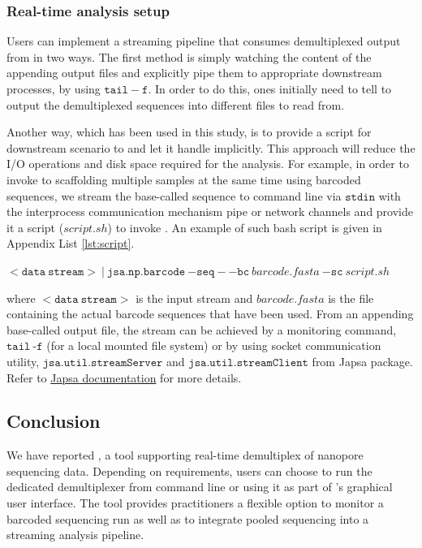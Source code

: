 \subsubsection{Real-time analysis setup}
Users can implement a streaming pipeline that consumes demultiplexed output from \npbarcode{} in two ways. 
The first method is simply watching the content of the appending output files and explicitly pipe them to appropriate downstream processes, \EG{} by using $\mathtt{tail -f}$.
In order to do this, ones initially need to tell \npbarcode{} to output the demultiplexed sequences into different files to read from.

Another way, which has been used in this study, is to provide a script for downstream scenario to \npbarcode{} and let it handle implicitly. This approach will reduce the I/O operations and disk space required for the analysis. For example, in order to invoke \npscarf{} to scaffolding multiple samples at the same time using barcoded sequences, we stream the base-called sequence to \npbarcode{} command line via $\mathtt{stdin}$ with the interprocess communication mechanism pipe or network channels \cite{CaoGE2015} and provide it a script ($\mathit{script.sh}$) to invoke \npscarf{}. An example of such bash script is given in Appendix List \ref{lst:script}.

$\mathtt{<data \: stream>}~|~\mathtt{jsa.np.barcode} \ \mathtt{-seq} \ \mathit{-} \ \mathtt{-bc} \ \mathit{barcode.fasta} \ \mathtt{-sc} \ \mathit{script.sh}$

where $\mathtt{<data \: stream>}$ is the input stream and $\mathit{barcode.fasta}$ is the file containing the actual barcode sequences that have been used.
From an appending base-called output file, the stream can be achieved by a monitoring command, \EG{} $\mathtt{tail}\ \text{-}\mathtt{f}$ (for a local mounted file system) or by using socket communication utility, \EG{} $\mathtt{jsa.util.streamServer}$ and $\mathtt{jsa.util.streamClient}$ from Japsa package.
Refer to \href{http://japsa.readthedocs.org/en/latest/index.html}{Japsa documentation} for more details.

\subsection{Conclusion}

We have reported \npbarcode{}, a tool supporting real-time demultiplex of nanopore sequencing data. 
Depending on requirements, users can choose to run the dedicated demultiplexer from command line or using it as part of \npreader's graphical user interface. 
The tool provides practitioners a flexible option to monitor a barcoded sequencing run as well as to integrate pooled sequencing into a streaming analysis pipeline.

